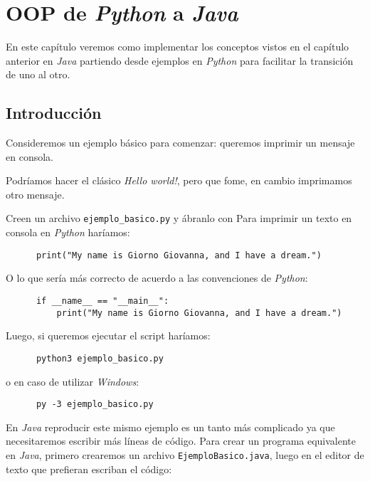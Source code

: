 \chapter{OOP de \textit{Python} a \textit{Java}}
  En este capítulo veremos como implementar los conceptos vistos en el capítulo anterior 
  en \textit{Java} partiendo desde ejemplos en \textit{Python} para facilitar la 
  transición de uno al otro.

  \section{Introducción}
    Consideremos un ejemplo básico para comenzar: queremos imprimir un mensaje en consola.

    Podríamos hacer el clásico \textit{Hello world!}, pero que fome, en cambio imprimamos
    otro mensaje.

    Creen un archivo \texttt{ejemplo\_basico.py} y ábranlo con 
    Para imprimir un texto en consola en \textit{Python} haríamos:

    \begin{verbatim}
      print("My name is Giorno Giovanna, and I have a dream.")      
    \end{verbatim}

    O lo que sería más correcto de acuerdo a las convenciones de \textit{Python}:

    \begin{verbatim}
      if __name__ == "__main__":
          print("My name is Giorno Giovanna, and I have a dream.")
    \end{verbatim}

    Luego, si queremos ejecutar el script haríamos:

    \begin{verbatim}
      python3 ejemplo_basico.py
    \end{verbatim}

    o en caso de utilizar \textit{Windows}:

    \begin{verbatim}
      py -3 ejemplo_basico.py
    \end{verbatim}

    En \textit{Java} reproducir este mismo ejemplo es un tanto más complicado ya que 
    necesitaremos escribir más líneas de código.
    Para crear un programa equivalente en \textit{Java}, primero crearemos un archivo 
    \texttt{EjemploBasico.java}, luego en el editor de texto que prefieran escriban el 
    código:

